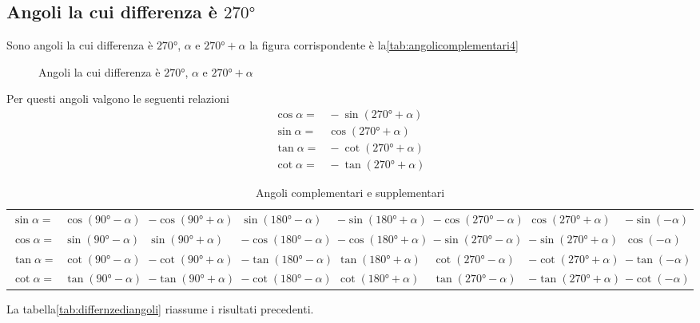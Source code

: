 \subsection{Angoli la cui differenza è $\ang{270}$}
Sono angoli la cui differenza è $\ang{270}$, $\alpha$ e $\ang{270}+\alpha$ la figura corrispondente è la\nobs\vref{tab:angolicomplementari4}
\begin{figure} %
	\centering
		
		\caption{Angoli la cui differenza è $\ang{270}$, $\alpha$ e $\ang{270}+\alpha$}
		\label{tab:angolicomplementari4}
\end{figure}
Per questi angoli valgono le seguenti relazioni
\begin{align*}
\cos\alpha=&{}-\sin(\ang{270}+\alpha)\\
\sin\alpha=&{}\cos(\ang{270}+\alpha)\\
\tan\alpha=&{}-\cot(\ang{270}+\alpha)\\
\cot\alpha=&{}-\tan(\ang{270}+\alpha)
\end{align*}
\begin{table}
\centering
	\footnotesize
	\begin{tabular}{rlllllll}
	\toprule
	$\sin\alpha=$&$\cos(\ang{90}-\alpha)$&$-\cos(\ang{90}+\alpha)$&$\sin(\ang{180}-\alpha)$&$-\sin(\ang{180}+\alpha)$&$-\cos(\ang{270}-\alpha)$&$\cos(\ang{270}+\alpha)$&$-\sin(-\alpha)$\\[.6cm] 
	$\cos\alpha=$&$\sin(\ang{90}-\alpha)$&$\sin(\ang{90}+\alpha)$&$-\cos(\ang{180}-\alpha)$&$-\cos(\ang{180}+\alpha)$&$-\sin(\ang{270}-\alpha)$&$-\sin(\ang{270}+\alpha)$&$\cos(-\alpha)$\\[.6cm] 
	$\tan\alpha=$&$\cot(\ang{90}-\alpha)$&$-\cot(\ang{90}+\alpha)$&$-\tan(\ang{180}-\alpha)$&$\tan(\ang{180}+\alpha)$&$\cot(\ang{270}-\alpha)$&$-\cot(\ang{270}+\alpha)$&$-\tan(-\alpha)$\\[.6cm] 
	$\cot\alpha=$&$\tan(\ang{90}-\alpha)$&$-\tan(\ang{90}+\alpha)$&$-\cot(\ang{180}-\alpha)$&$\cot(\ang{180}+\alpha)$&$\tan(\ang{270}-\alpha)$&$-\tan(\ang{270}+\alpha)$&$-\cot(-\alpha)$\\[.6cm]
	\bottomrule
	\end{tabular}
	\caption{Angoli complementari e supplementari}
	\label{tab:differnzediangoli}
\end{table}
La tabella\nobs\vref{tab:differnzediangoli} riassume i risultati precedenti.
